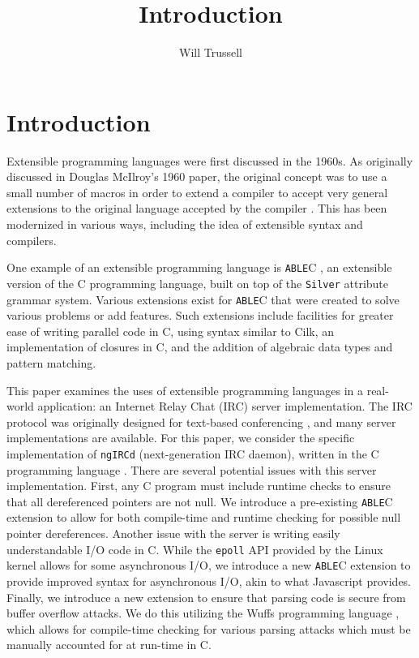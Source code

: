 \documentclass[main.tex]{subfiles}
\author{Will Trussell}
\title{Introduction}
\begin{document}
\section{Introduction}

Extensible programming languages were first discussed in the 1960s. As
originally discussed in Douglas McIlroy's 1960 paper, the original concept was
to use a small number of macros in order to extend a compiler to accept very
general extensions to the original language accepted by the compiler 
\cite{6}. This has been modernized in various ways, including the idea
of extensible syntax and compilers.

One example of an extensible programming language is \verb|ABLE|C \cite{8}, 
an extensible version of the C programming language, built on top of the 
\verb|Silver| \cite{3} attribute grammar system. Various extensions exist for 
\verb|ABLE|C that were created to solve various problems or add features. Such
extensions include facilities for greater ease of writing parallel code in C, using syntax
similar to Cilk\cite{2}, an implementation of closures in C, and the addition of algebraic
data types and pattern matching.

This paper examines the uses of extensible programming languages in a real-world
application: an Internet Relay Chat (IRC) server implementation. The IRC
protocol was originally designed for text-based conferencing \cite{7}, and
many server implementations are available. For this paper, we consider the
specific implementation of \verb|ngIRCd| (next-generation IRC daemon), written 
in the C programming language \cite{1}. There are several potential issues with this 
server implementation. First, any C program must include runtime checks to 
ensure that all dereferenced pointers are not null. We introduce a pre-existing \verb|ABLE|C extension to 
allow for both compile-time and runtime checking for possible null pointer dereferences.  Another 
issue with the server is writing easily understandable I/O code in C. While the 
\verb|epoll| API provided by the Linux kernel allows for some asynchronous I/O, 
we introduce a new \verb|ABLE|C extension to provide improved syntax for 
asynchronous I/O, akin to what Javascript provides. Finally, we introduce a new 
extension to ensure that parsing code is secure from buffer overflow attacks. We do this utilizing the Wuffs 
programming language \cite{5}, which allows for compile-time checking for various 
parsing attacks which must be manually accounted for at run-time in C.
\end{document}
